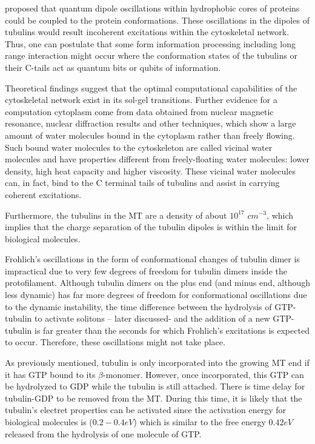 \documentclass[letterpaper,final,times]{cas-dc}
\numberwithin{equation}{section}
\begin{document}
\citet{25} proposed that quantum dipole oscillations within hydrophobic cores of proteins could be coupled to the protein conformations. These oscillations in the dipoles of tubulins would result incoherent excitations within the cytoskeletal network. Thus, one can postulate that some form information processing including long range interaction might occur where the conformation states of the tubulins or their C-tails act as quantum bits or qubits of information.

Theoretical findings suggest that the optimal computational capabilities of the cytoskeletal network exist in its sol-gel transitions\citep{56, 57}. Further evidence for a computation cytoplasm come from data obtained from nuclear magnetic resonance, nuclear diffraction results and other techniques, which show a large amount of water molecules bound in the cytoplasm rather than freely flowing. Such bound water molecules to the cytoskeleton are called
vicinal water molecules and have properties different from freely-floating water molecules: lower density, high heat capacity and higher viscosity. These vicinal water molecules can, in fact, bind to the C terminal tails of tubulins and assist in carrying coherent excitations.

Furthermore, the tubulins in the MT are a density of about $10^{17}$ $cm^{-3}$, which implies that the charge separation of the tubulin dipoles is within the limit for biological molecules\citep{59}.

Frohlich’s oscillations in the form of conformational changes of tubulin dimer is impractical due to very few degrees of freedom for tubulin dimers inside the protofilament. Although tubulin dimers on the plus end (and minus end, although less dynamic) has far more degrees of freedom for conformational oscillations due to the dynamic instability, the time difference between the hydrolysis of GTP-tubulin to activate solitons – later discussed- and the addition of a new GTP-tubulin is far greater than the  seconds for which Frohlich’s excitations is expected to occur. Therefore, these oscillations might not take place.

As previously mentioned, tubulin is only incorporated into the growing MT end if it has GTP bound to its $\beta$-monomer. However, once incorporated, this GTP can be hydrolyzed to GDP while the tubulin is still attached. There is time delay for tubulin-GDP to be removed from the MT. During this time, it is likely that the tubulin’s electret properties can be activated since the activation energy for biological molecules is ($0.2-0.4 eV$)\citep{58} which is similar to the free energy $0.42eV$\citep{87} released from the hydrolysis of one molecule of GTP.
\end{document}
